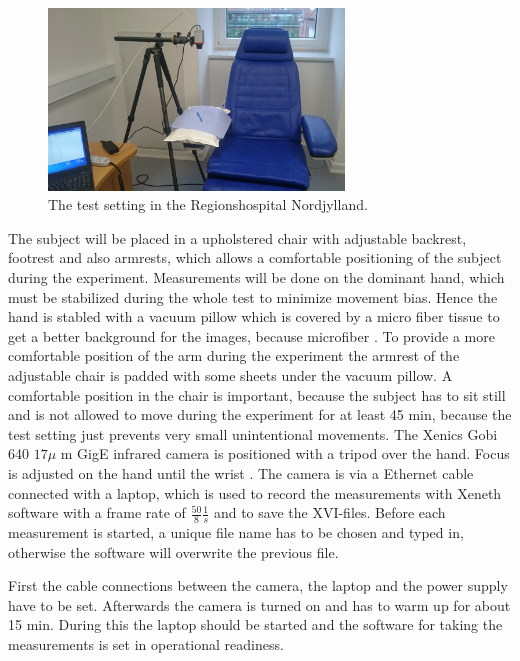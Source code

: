 \begin{figure}[H]
	\includegraphics[width=0.7\textwidth]{figures/setting}
	\caption{The test setting in the Regionshospital Nordjylland.}
	\label{fig:setting}
\end{figure}

The subject will be placed in a upholstered chair with adjustable backrest, footrest and also armrests, which allows a comfortable positioning of the subject during the experiment. Measurements will be done on the dominant hand, which must be stabilized during the whole test to minimize movement bias. Hence the hand is stabled with a vacuum pillow which is covered by a micro fiber tissue to get a better background for the images, because microfiber . To provide a more comfortable position of the arm during the experiment the armrest of the adjustable chair is padded with some sheets under the vacuum pillow. A comfortable position in the chair is important, because the subject has to sit still and is not allowed to move during the experiment for at least 45 min, because the test setting just prevents very small unintentional movements.
The Xenics Gobi 640 $17\mu$ m GigE infrared camera is positioned with a tripod over the hand. Focus is adjusted on the hand until the wrist .
The camera is via a Ethernet cable connected with a laptop, which is used to record the measurements with Xeneth software with a frame rate of $ \frac{50}{8} \frac{1}{s} $ and to save the XVI-files. Before each measurement is started, a unique file name has to be chosen and typed in, otherwise the software will overwrite the previous file.

First the cable connections between the camera, the laptop and the power supply have to be set. Afterwards the camera is turned on and has to warm up for about 15 min. During this the laptop should be started and the software for taking the measurements is set in operational readiness. 

